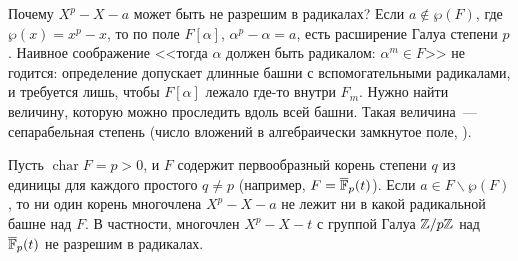 Почему $X^p-X-a$ может быть не разрешим в радикалах? Если $a\notin\wp(F)$, где $\wp(x)=x^p-x$, то по  поле
$F[\alpha]$, $\alpha^p-\alpha=a$, есть расширение Галуа степени $p$. Наивное соображение <<тогда $\alpha$ должен быть
радикалом: $\alpha^m\in F$>> не годится: определение  допускает длинные башни с вспомогательными радикалами, и
требуется лишь, чтобы $F[\alpha]$ лежало где-то внутри $F_m$. Нужно найти величину, которую можно проследить вдоль всей
башни. Такая величина~--- сепарабельная степень (число вложений в алгебраически замкнутое поле, ).

\begin{proposition}[3.29a]
Пусть $\operatorname{char}F=p>0$, и $F$ содержит первообразный корень степени $q$ из единицы для каждого простого $q\ne p$
(например, $F=\overline{\mathbb F}_p(t)$). Если $a\in F\smallsetminus\wp(F)$, то ни один корень многочлена $X^p-X-a$ не лежит ни в какой
радикальной башне над $F$. В частности, многочлен $X^p-X-t$ с группой Галуа $\mathbb Z/p\mathbb Z$ над $\overline{\mathbb F}_p(t)$ не разрешим в радикалах.
\end{proposition}

